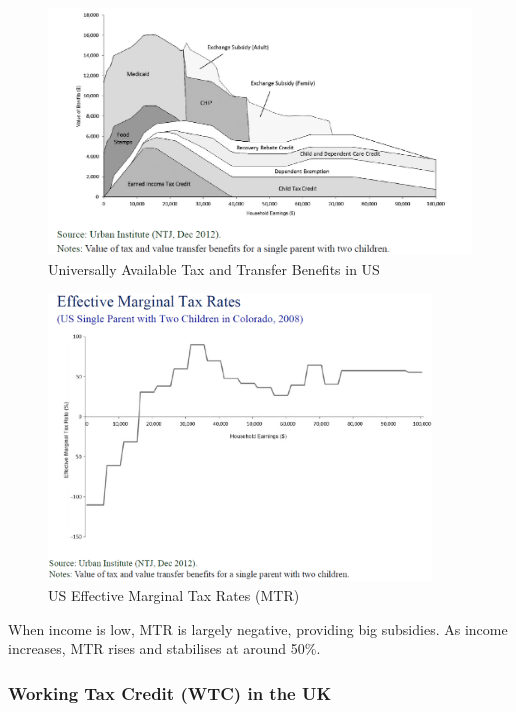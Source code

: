             \begin{figure}[H]
                \centering
                \includegraphics[width=5in]{images/ch13/13_US_Tax_and_trans.png}
                \caption{Universally Available Tax and Transfer Benefits in US}
            \end{figure}
    
            \begin{figure}[H]
                \centering
                \includegraphics[width=4in]{images/ch13/13_US_MTR.png}
                \caption{US Effective Marginal Tax Rates (MTR)}
            \end{figure}
            When income is low, MTR is largely negative, providing big subsidies. As income increases, MTR rises and stabilises at around 50\%.

        \subsubsection{Working Tax Credit (WTC) in the UK}

